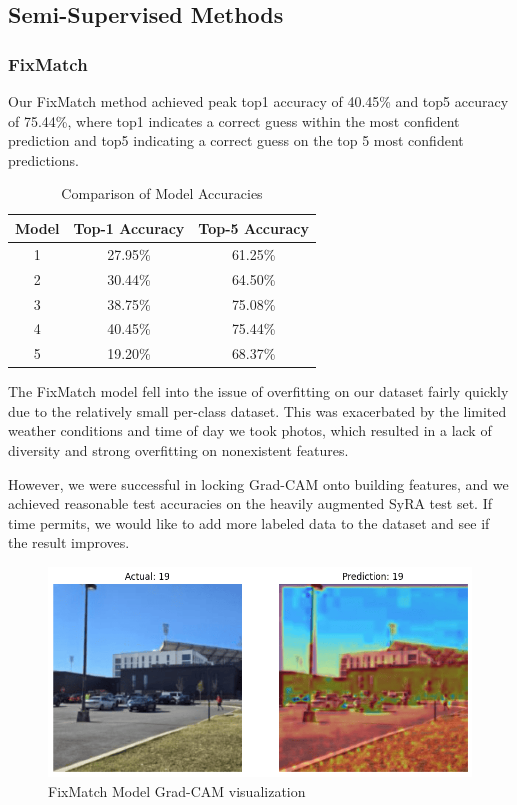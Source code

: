\documentclass{article}
\begin{document}
\subsection{Semi-Supervised Methods}
\subsubsection{FixMatch}

Our FixMatch method achieved peak top1 accuracy of 40.45\% and top5 accuracy of 75.44\%, where top1 indicates a correct guess within the most confident prediction and top5 indicating a correct guess on the top 5 most confident predictions.

\begin{table}[H]
    \centering
    \begin{tabular}{|c|c|c|}
        \hline
        Model & Top-1 Accuracy & Top-5 Accuracy \\
        \hline
        1 & 27.95\% & 61.25\% \\
        \hline
        2 & 30.44\% & 64.50\% \\
        \hline
        3 & 38.75\% & 75.08\% \\
        \hline
        4 & 40.45\% & 75.44\% \\
        \hline
        5 & 19.20\% & 68.37\% \\
        \hline
    \end{tabular}
    \caption{Comparison of Model Accuracies}
    \label{tab:fm_model_accuracies}
\end{table}

The FixMatch model fell into the issue of overfitting on our dataset fairly quickly due to the relatively small per-class dataset. This was exacerbated by the limited weather conditions and time of day we took photos, which resulted in a lack of diversity and strong overfitting on nonexistent features. 

However, we were successful in locking Grad-CAM onto building features, and we achieved reasonable test accuracies on the heavily augmented SyRA test set. If time permits, we would like to add more labeled data to the dataset and see if the result improves. 

\begin{figure}[H]
    \centering
    \includegraphics[width=0.8\linewidth]{fixmatch.png}
    \caption{FixMatch Model Grad-CAM visualization}
    \label{fig:fixmatch_results}
\end{figure}
\end{document}
